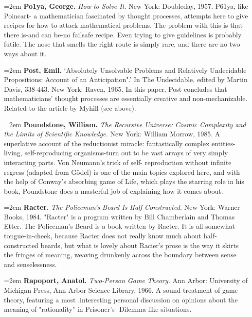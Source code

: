 \par\noindent\hangindent=2em {\bf Po1ya, George.} {\it How to Solve It.} New York: Doubleday, 1957. P61ya, like Poincart- a mathematician fascinated by thought processes, attempts here to give recipes for how to attack mathematical problems. The problem with this is that there is-and can be-no failsafe recipe. Even trying to give guidelines is probably futile. The nose that smells the right route is simply rare, and there are no two ways about it.

\par\noindent\hangindent=2em {\bf Post, Emil.} `Absolutely Unsolvable Problems and Relatively Undecidable Propositions: Account of an Anticipation".' In The Undecidable, edited by Martin Davis, 338-443. New York: Raven, 1965. In this paper, Post concludes that mathematicians' thought processes are essentially creative and non-mechanizable. Related to the article by Myhill (see above).

\par\noindent\hangindent=2em {\bf Poundstone, William.} {\it The Recursive Universe: Cosmic Complexity and the Limits of Scientific Knowledge.} New York: William Morrow, 1985. A superlative account of the reductionist miracle: fantastically complex entities-living, self-reproducing organisms-turn out to be vast arrays of very simply interacting parts. Von Neumann's trick of self- reproduction without infinite regress (adapted from Gödel) is one of the main topics explored here, and with the help of Conway's absorbing game of Life, which plays the starring role in his book, Poundstone does a masterful job of explaining how it comes about.

\par\noindent\hangindent=2em {\bf Racter.} {\it The Policeman's Beard Is Half Constructed.} New York: Warner Books, 1984. "Racter" is a program written by Bill Chamberlain and Thomas Etter. The Policeman's Beard is a book written by Racter. It is all somewhat tongue-in-cheek, because Racter does not really know much about half-constructed beards, but what is lovely about Racier's prose is the way it skirts the fringes of meaning, weaving drunkenly across the boundary between sense and senselessness.

\par\noindent\hangindent=2em {\bf Rapoport, Anatol.} {\it Two-Person Game Theory.} Ann Arbor: University of Michigan Press, Ann Arbor Science Library, 1966. A sound treatment of game theory, featuring a most .interesting personal discussion on opinions about the meaning of "rationality" in Prisoner's- Dilemma-like situations.

